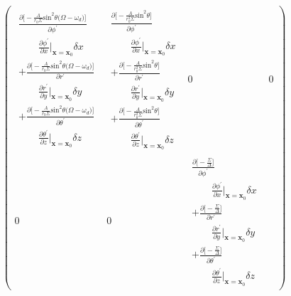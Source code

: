 \documentclass[english]{article}
\begin{document}
\begin{align*}
\begin{pmatrix}
\begin{array}{c}
\frac{\partial\biggl[-\frac{A}{r_{0}\Sigma}\text{sin}^{2}\theta\biggl(\Omega-\omega_{d}\biggr)\biggr]}{\partial\phi^{'}}\\
\qquad\frac{\partial\phi^{'}}{\partial x}\big|_{\boldsymbol{x}=\boldsymbol{x}_{0}}\delta x\\
+\frac{\partial\biggl[-\frac{A}{r_{0}\Sigma}\text{sin}^{2}\theta\biggl(\Omega-\omega_{d}\biggr)\biggr]}{\partial r^{'}}\\
\qquad\frac{\partial r^{'}}{\partial y}\big|_{\boldsymbol{x}=\boldsymbol{x}_{0}}\delta y\\
+\frac{\partial\biggl[-\frac{A}{r_{0}\Sigma}\text{sin}^{2}\theta\biggl(\Omega-\omega_{d}\biggr)\biggr]}{\partial\theta^{'}}\\
\qquad\frac{\partial\theta^{'}}{\partial z}\big|_{\boldsymbol{x}=\boldsymbol{x}_{0}}\delta z
\end{array} & \begin{array}{c}
\frac{\partial\biggl[-\frac{A}{r^{2}_{0}\Sigma}\text{sin}^{2}\theta\biggr]}{\partial\phi^{'}}\\
\qquad\frac{\partial\phi^{'}}{\partial x}\big|_{\boldsymbol{x}=\boldsymbol{x}_{0}}\delta x\\
+\frac{\partial\biggl[-\frac{A}{r^{2}_{0}\Sigma}\text{sin}^{2}\theta\biggr]}{\partial r^{'}}\\
\qquad\frac{\partial r^{'}}{\partial y}\big|_{\boldsymbol{x}=\boldsymbol{x}_{0}}\delta y\\
+\frac{\partial\biggl[-\frac{A}{r^{2}_{0}\Sigma}\text{sin}^{2}\theta\biggr]}{\partial\theta^{'}}\\
\qquad\frac{\partial\theta^{'}}{\partial z}\big|_{\boldsymbol{x}=\boldsymbol{x}_{0}}\delta z
\end{array} & 0 & 0\\
0 & 0 & \begin{array}{c}
\frac{\partial\biggl[-\frac{\Sigma}{\Delta}\biggr]}{\partial\phi^{'}}\\
\qquad\frac{\partial\phi^{'}}{\partial x}\big|_{\boldsymbol{x}=\boldsymbol{x}_{0}}\delta x\\
+\frac{\partial\biggl[-\frac{\Sigma}{\Delta}\biggr]}{\partial r^{'}}\\
\qquad\frac{\partial r^{'}}{\partial y}\big|_{\boldsymbol{x}=\boldsymbol{x}_{0}}\delta y\\
+\frac{\partial\biggl[-\frac{\Sigma}{\Delta}\biggr]}{\partial\theta^{'}}\\
\qquad\frac{\partial\theta^{'}}{\partial z}\big|_{\boldsymbol{x}=\boldsymbol{x}_{0}}\delta z

\end{array}
\end{pmatrix}
\end{align*}
\end{document}
